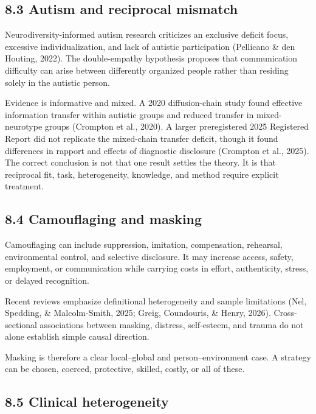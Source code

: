 \documentclass[
  11pt,
]{article}
\begin{document}
\subsection{8.3 Autism and reciprocal
mismatch}\label{autism-and-reciprocal-mismatch}

Neurodiversity-informed autism research criticizes an exclusive deficit
focus, excessive individualization, and lack of autistic participation
(Pellicano \& den Houting, 2022). The double-empathy hypothesis proposes
that communication difficulty can arise between differently organized
people rather than residing solely in the autistic person.

Evidence is informative and mixed. A 2020 diffusion-chain study found
effective information transfer within autistic groups and reduced
transfer in mixed-neurotype groups (Crompton et al., 2020). A larger
preregistered 2025 Registered Report did not replicate the mixed-chain
transfer deficit, though it found differences in rapport and effects of
diagnostic disclosure (Crompton et al., 2025). The correct conclusion is
not that one result settles the theory. It is that reciprocal fit, task,
heterogeneity, knowledge, and method require explicit treatment.

\subsection{8.4 Camouflaging and
masking}\label{camouflaging-and-masking}

Camouflaging can include suppression, imitation, compensation,
rehearsal, environmental control, and selective disclosure. It may
increase access, safety, employment, or communication while carrying
costs in effort, authenticity, stress, or delayed recognition.

Recent reviews emphasize definitional heterogeneity and sample
limitations (Nel, Spedding, \& Malcolm-Smith, 2025; Greig, Coundouris,
\& Henry, 2026). Cross-sectional associations between masking, distress,
self-esteem, and trauma do not alone establish simple causal direction.

Masking is therefore a clear local--global and person--environment case.
A strategy can be chosen, coerced, protective, skilled, costly, or all
of these.

\subsection{8.5 Clinical heterogeneity}\label{clinical-heterogeneity}
\end{document}
